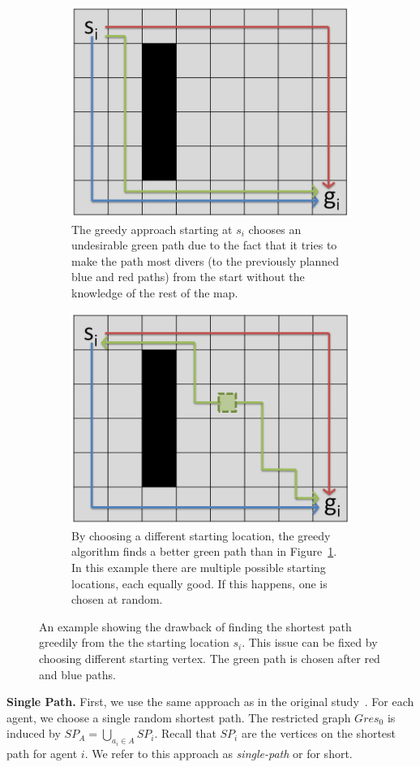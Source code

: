 \begin{figure}[ht]
\centering

\begin{subfigure}[t]{0.99\columnwidth}
\centering
\includegraphics[width=0.45\columnwidth]{img/distant_wrong.PNG}
\caption{The greedy approach starting at $s_i$ chooses an undesirable green path due to the fact that it tries to make the path most divers (to the previously planned blue and red paths) from the start without the knowledge of the rest of the map.} %
\label{fig:distant_wrong}
\end{subfigure}
\hfill
\begin{subfigure}[t]{0.99\columnwidth}
\centering
\includegraphics[width=0.45\columnwidth]{img/distant_ok.PNG}
\caption{By choosing a different starting location, the greedy algorithm finds a better green path than in Figure~\ref{fig:distant_wrong}. In this example there are multiple possible starting locations, each equally good. If this happens, one is chosen at random.}
\label{fig:distant_ok}
\end{subfigure}

\caption{An example showing the drawback of finding the shortest path greedily from the the starting location $s_i$. This issue can be fixed by choosing different starting vertex. The green path is chosen after red and blue paths.}
\label{fig:distant}
\end{figure}

\textbf{Single Path.}
First, we use the same approach as in the original study~\cite{AAMAS_corridors}.
For each agent, we choose a single random shortest path. The restricted graph $Gres_{0}$ is induced by $SP_A = \bigcup_{a_i \in A} SP_i$. Recall that $SP_i$ are the vertices on the shortest path for agent $i$. We refer to this approach as \emph{single-path} or \pss{} for short.



